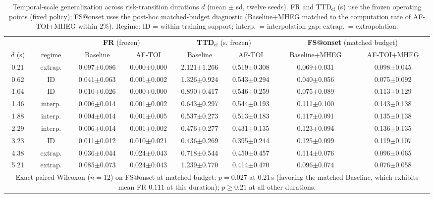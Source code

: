 \documentclass[a4paper,fleqn]{cas-dc}
\begin{document}
{\begin{table}[!tbp]
\color{\revcolor}
\centering
\caption{Temporal-scale generalization across risk-transition durations
$d$ (mean $\pm$ sd, twelve seeds). FR and $\mathrm{TTD}_{\mathrm{ef}}$ (s)
use the frozen operating points (fixed policy); FS@onset uses the post-hoc
matched-budget diagnostic (Baseline+MHEG matched to the computation rate of
\mbox{AF-TOI}+MHEG within $2\%$). Regime: ID = within training support;
interp.\ = interpolation gap; extrap.\ = extrapolation.}
\label{tab:temporal_scale}
\footnotesize
\setlength{\tabcolsep}{5pt}
\renewcommand{\arraystretch}{1.15}
\begin{tabular}{cc cc cc cc}
\toprule
& & \multicolumn{2}{c}{\textbf{FR} (frozen)}
  & \multicolumn{2}{c}{\textbf{TTD$_{\mathrm{ef}}$} (s, frozen)}
  & \multicolumn{2}{c}{\textbf{FS@onset} (matched budget)} \\
\cmidrule(lr){3-4}\cmidrule(lr){5-6}\cmidrule(lr){7-8}
$d$ (s) & regime & Baseline & \mbox{AF-TOI} & Baseline & \mbox{AF-TOI}
        & Baseline+MHEG & \mbox{AF-TOI}+MHEG \\
\midrule
0.21 & extrap. & 0.097$\pm$0.086 & 0.000$\pm$0.000 & 2.121$\pm$1.266 & 0.519$\pm$0.308 & 0.069$\pm$0.031 & 0.098$\pm$0.045 \\
0.62 & ID      & 0.041$\pm$0.063 & 0.001$\pm$0.002 & 1.326$\pm$0.924 & 0.543$\pm$0.294 & 0.040$\pm$0.056 & 0.075$\pm$0.092 \\
1.04 & ID      & 0.010$\pm$0.026 & 0.000$\pm$0.000 & 0.890$\pm$0.417 & 0.546$\pm$0.259 & 0.075$\pm$0.089 & 0.113$\pm$0.129 \\
1.46 & interp. & 0.006$\pm$0.014 & 0.001$\pm$0.002 & 0.643$\pm$0.297 & 0.544$\pm$0.193 & 0.111$\pm$0.100 & 0.143$\pm$0.138 \\
1.88 & interp. & 0.004$\pm$0.014 & 0.001$\pm$0.005 & 0.537$\pm$0.273 & 0.513$\pm$0.183 & 0.117$\pm$0.091 & 0.135$\pm$0.138 \\
2.29 & interp. & 0.006$\pm$0.014 & 0.001$\pm$0.002 & 0.476$\pm$0.277 & 0.431$\pm$0.135 & 0.123$\pm$0.094 & 0.136$\pm$0.135 \\
3.23 & ID      & 0.011$\pm$0.012 & 0.010$\pm$0.021 & 0.436$\pm$0.269 & 0.395$\pm$0.244 & 0.125$\pm$0.099 & 0.119$\pm$0.107 \\
4.38 & extrap. & 0.036$\pm$0.044 & 0.024$\pm$0.043 & 0.718$\pm$0.544 & 0.450$\pm$0.457 & 0.114$\pm$0.076 & 0.096$\pm$0.065 \\
5.21 & extrap. & 0.085$\pm$0.073 & 0.024$\pm$0.043 & 1.239$\pm$0.770 & 0.414$\pm$0.470 & 0.096$\pm$0.074 & 0.076$\pm$0.058 \\
\bottomrule
\multicolumn{8}{p{0.9\textwidth}}{\footnotesize Exact paired Wilcoxon
($n{=}12$) on FS@onset at matched budget: $p=0.027$ at $0.21$\,s (favoring
the matched Baseline, which exhibits mean FR $0.111$ at this duration);
$p\ge0.21$ at all other durations.}
\end{tabular}
\end{table}
}
\end{document}
